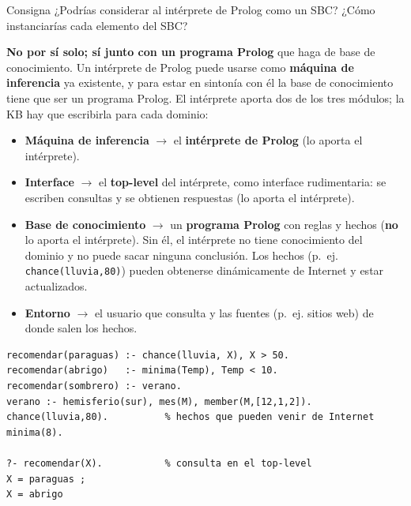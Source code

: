 \documentclass[11pt,a4paper]{article}
\begin{document}
\begin{enunciado}{Consigna}
¿Podrías considerar al intérprete de Prolog como un SBC? ¿Cómo instanciarías cada elemento del SBC?
\end{enunciado}

\textbf{No por sí solo; sí junto con un programa Prolog} que haga de base de conocimiento. Un intérprete de Prolog puede usarse como \textbf{máquina de inferencia} ya existente, y para estar en sintonía con él la base de conocimiento tiene que ser un programa Prolog. El intérprete aporta dos de los tres módulos; la KB hay que escribirla para cada dominio:
\begin{itemize}
  \item \textbf{Máquina de inferencia} $\to$ el \textbf{intérprete de Prolog} (lo aporta el intérprete).
  \item \textbf{Interface} $\to$ el \textbf{top-level} del intérprete, como interface rudimentaria: se escriben consultas y se obtienen respuestas (lo aporta el intérprete).
  \item \textbf{Base de conocimiento} $\to$ un \textbf{programa Prolog} con reglas y hechos (\textbf{no} lo aporta el intérprete). Sin él, el intérprete no tiene conocimiento del dominio y no puede sacar ninguna conclusión. Los hechos (p.~ej. \texttt{chance(lluvia,80)}) pueden obtenerse dinámicamente de Internet y estar actualizados.
  \item \textbf{Entorno} $\to$ el usuario que consulta y las fuentes (p.~ej. sitios web) de donde salen los hechos.
\end{itemize}

\begin{codigo}
\begin{verbatim}
recomendar(paraguas) :- chance(lluvia, X), X > 50.
recomendar(abrigo)   :- minima(Temp), Temp < 10.
recomendar(sombrero) :- verano.
verano :- hemisferio(sur), mes(M), member(M,[12,1,2]).
chance(lluvia,80).          % hechos que pueden venir de Internet
minima(8).

?- recomendar(X).           % consulta en el top-level
X = paraguas ;
X = abrigo
\end{verbatim}
\end{codigo}
\end{document}
